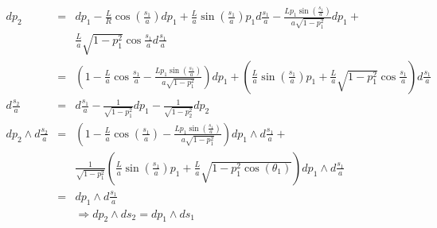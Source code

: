 {\begin{eqnarray}
dp_{2}&=&dp_{1}-\frac{L}{R}\cos(\frac{s_{1}}{a})dp_{1}+\frac{L}{a}\sin(\frac{s_{1}}{a})p_{1}d\frac{s_{1}}{a}-
\frac{Lp_{1}\sin(\frac{s_{1}}{a})}{a\sqrt{1-p_{1}^{2}}}dp_{1}+
\\\nonumber&&\frac{L}{a}\sqrt{1-p_{1}^{2}}\cos{\frac{s_{1}}{a}}d\frac{s_{1}}{a}\\\nonumber
&=&(1-\frac{L}{a}\cos{\frac{s_{1}}{a}}-\frac{Lp_{1}\sin(\frac{s_{1}}{a})}{a\sqrt{1-p_{1}^{2}}})dp_{1}
+(\frac{L}{a}\sin(\frac{s_{1}}{a})p_{1}+\frac{L}{a}\sqrt{1-p_{1}^{2}}\cos{\frac{s_{1}}{a}})d\frac{s_{1}}{a}\\\nonumber
d\frac{s_{2}}{a}&=&d\frac{s_{1}}{a}-\frac{1}{\sqrt{1-p_{1}^{2}}}dp_{1}-\frac{1}{\sqrt{1-p_{2}^{2}}}dp_{2}\\\nonumber
dp_{2}\wedge d\frac{s_{2}}{a}&=& (1-\frac{L}{a}\cos(\frac{s_{1}}{a})-\frac{Lp_{1}\sin(\frac{s_{1}}{a})}{a\sqrt{1-p_{1}^{2}}})dp_{1}{\wedge}d\frac{s_{1}}{a}+\\&&\frac{1}{\sqrt{1-p_{1}^{2}}}(\frac{L}{a}\sin(\frac{s_{1}}{a})p_{1}
+\frac{L}{a}\sqrt{1-p_{1}^{2}\cos(\theta_{1})})dp_{1}\wedge d\frac{s_{1}}{a}\\\nonumber
&=&dp_{1}\wedge d\frac{s_{1}}{a}\\
&&\Rightarrow dp_{2}\wedge ds_{2} = dp_{1}\wedge ds_{1}
\end{eqnarray}
    }%